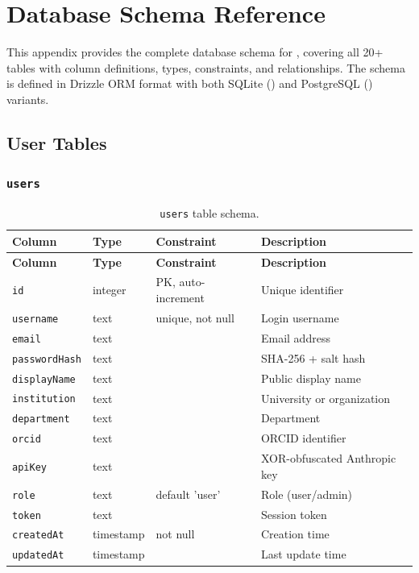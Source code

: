 \chapter{Database Schema Reference}
\label{app:schema}

This appendix provides the complete database schema for \autoscholar, covering all 20+ tables with column definitions, types, constraints, and relationships.
The schema is defined in Drizzle ORM format with both SQLite () and PostgreSQL () variants.

\section{User Tables}
\label{sec:schema:user}

\subsection{\texttt{users}}

\begin{longtable}{lllp{4cm}}
\caption{\texttt{users} table schema.} \label{tab:schema-users} \\
\toprule
\textbf{Column} & \textbf{Type} & \textbf{Constraint} & \textbf{Description} \\
\midrule
\endfirsthead
\toprule
\textbf{Column} & \textbf{Type} & \textbf{Constraint} & \textbf{Description} \\
\midrule
\endhead
\texttt{id} & integer & PK, auto-increment & Unique identifier \\
\texttt{username} & text & unique, not null & Login username \\
\texttt{email} & text & & Email address \\
\texttt{passwordHash} & text & & SHA-256 + salt hash \\
\texttt{displayName} & text & & Public display name \\
\texttt{institution} & text & & University or organization \\
\texttt{department} & text & & Department \\
\texttt{orcid} & text & & ORCID identifier \\
\texttt{apiKey} & text & & XOR-obfuscated Anthropic key \\
\texttt{role} & text & default 'user' & Role (user/admin) \\
\texttt{token} & text & & Session token \\
\texttt{createdAt} & timestamp & not null & Creation time \\
\texttt{updatedAt} & timestamp & & Last update time \\
\bottomrule
\end{longtable}

